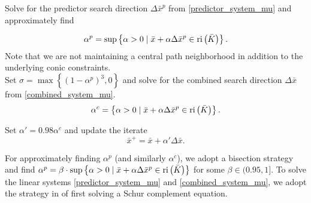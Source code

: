 \documentclass[10pt]{article}
\theoremstyle{definition}
\theoremstyle{plain}
\def\relint{\protect{\textnormal{ri}}}
\begin{document}
Solve for the predictor search direction $\Delta \bar x^p$ from \eqref{predictor_system_mu} and approximately find

\[\alpha^p = \sup \left\{ \alpha > 0 \mid \bar x + \alpha \Delta \bar x^p \in \relint \left(\bar K\right)
 \right\}. \]
Note that we are not maintaining a central path neighborhood in addition to the underlying conic constraints. \\

Set $\sigma = \max\left\{(1-\alpha^p)^3, 0\right\}$ and solve for the combined search direction $\Delta \bar x$ from \eqref{combined_system_mu}. \\

\[\alpha^c = \left\{ \alpha > 0 \mid \bar x + \alpha \Delta \bar x^p \in \relint \left(\bar K\right)
\right\}. \]

Set $\alpha' = 0.98 \alpha^c$ and update the iterate
\[\bar x^+ = \bar x + \alpha' \Delta\bar x.\]

For approximately finding $\alpha^p$ (and similarly $\alpha^c$), we adopt a bisection strategy and find $\alpha^p = \beta \cdot \sup \left\{ \alpha > 0 \mid \bar x + \alpha \Delta \bar x^p \in \relint \left(\bar K\right)
\right\}$ for some $\beta \in (0.95,1]$. To solve the linear systems \eqref{predictor_system_mu} and \eqref{combined_system_mu}, we adopt the strategy in \cite{SDPT3_2010} of first solving a Schur complement equation.
\end{document}
